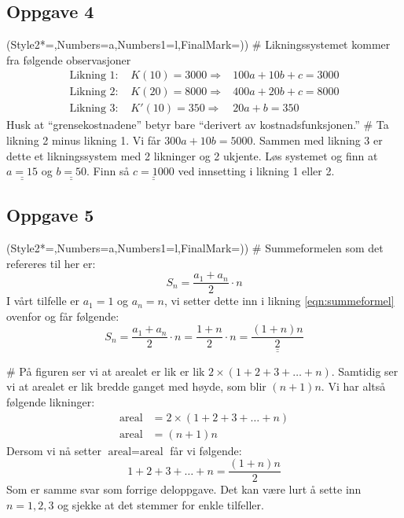 \documentclass[12pt, a4paper]
{article}						%
\def\answer#1{\underline{\underline{#1}}}
\begin{document}
	
	\subsection*{Oppgave 4}
	\begin{easylist}[enumerate]
		\ListProperties(Style2*=,Numbers=a,Numbers1=l,FinalMark={)})
		# Likningssystemet kommer fra følgende observasjoner
		\begin{align*}
		\text{Likning 1: }&K(10) = 3000\Rightarrow & 100a + 10b + c = 3000 \\
		\text{Likning 2: }&K(20) = 8000 \Rightarrow & 400a + 20b + c = 8000 \\
		\text{Likning 3: }&K'(10) = 350 \Rightarrow & 20a + b = 350 
		\end{align*}
		Husk at ``grensekostnadene'' betyr bare ``derivert av kostnadsfunksjonen.''
		# Ta likning 2 minus likning 1. Vi får $300a + 10b = 5000$. 
		Sammen med likning 3 er dette et likningssystem med 2 likninger og 2 ukjente. 
		Løs systemet og finn at $\answer{a = 15}$ og $\answer{b = 50}$. 
		Finn så $\answer{c = 1000}$ ved innsetting i likning 1 eller 2.
	\end{easylist}
	
	\subsection*{Oppgave 5}
	\begin{easylist}[enumerate]
		\ListProperties(Style2*=,Numbers=a,Numbers1=l,FinalMark={)})
		# Summeformelen som det refereres til her er:
		\begin{equation}
		\label{eqn:summeformel}
		S_n = \frac{a_1 + a_n}{2} \cdot n
		\end{equation}
		I vårt tilfelle er $a_1 = 1$ og $a_n = n$, vi setter dette inn i likning \eqref{eqn:summeformel} ovenfor og får følgende:
		\begin{equation*}
		S_n = \frac{a_1 + a_n}{2} \cdot n = \frac{1 + n}{2} \cdot n = \answer{\frac{\left(1+n\right)n}{2}}
		\end{equation*}
		
		# På figuren ser vi at arealet er lik er lik $2 \times \left( 1+2+3+ \dots +n \right)$. 
		Samtidig ser vi at arealet er lik bredde ganget med høyde, som blir $(n+1)n$. 
		Vi har altså følgende likninger:
		\begin{align*}
		\text{areal} &= 2 \times \left( 1+2+3+ \dots +n \right)  \\
		\text{areal} &= (n+1)n 
		\end{align*}
		Dersom vi nå setter $\text{areal} = \text{areal}$ får vi følgende:
		\begin{equation*}
		1+2+3+ \dots +n = \frac{\left(1+n\right)n}{2}
		\end{equation*}
		Som er samme svar som forrige deloppgave. 
		Det kan være lurt å sette inn $n = 1,2,3$ og sjekke at det stemmer for enkle tilfeller.
	\end{easylist}
	
\end{document}
